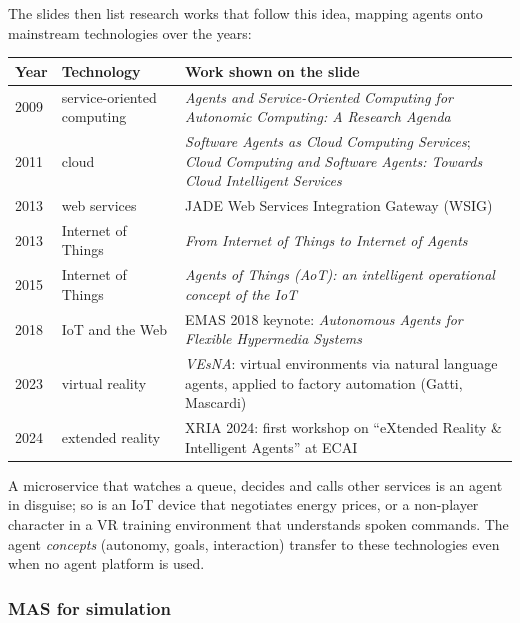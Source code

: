 The slides then list research works that follow this idea, mapping agents onto mainstream
technologies over the years:

\begin{center}
\small
\begin{tabularx}{\linewidth}{@{}l l X@{}}
\toprule
\textbf{Year} & \textbf{Technology} & \textbf{Work shown on the slide} \\
\midrule
2009 & service-oriented computing & \emph{Agents and Service-Oriented Computing for Autonomic Computing: A Research Agenda} \\
2011 & cloud & \emph{Software Agents as Cloud Computing Services}; \emph{Cloud Computing and Software Agents: Towards Cloud Intelligent Services} \\
2013 & web services & JADE Web Services Integration Gateway (WSIG) \\
2013 & Internet of Things & \emph{From Internet of Things to Internet of Agents} \\
2015 & Internet of Things & \emph{Agents of Things (AoT): an intelligent operational concept of the IoT} \\
2018 & IoT and the Web & EMAS 2018 keynote: \emph{Autonomous Agents for Flexible Hypermedia Systems} \\
2023 & virtual reality & \emph{VEsNA}: virtual environments via natural language agents, applied to factory automation (Gatti, Mascardi) \\
2024 & extended reality & XRIA 2024: first workshop on ``eXtended Reality \& Intelligent Agents'' at ECAI \\
\bottomrule
\end{tabularx}
\end{center}

\begin{nbwhy}
A microservice that watches a queue, decides and calls other services is an agent in
disguise; so is an IoT device that negotiates energy prices, or a non-player character in a
VR training environment that understands spoken commands. The agent \emph{concepts}
(autonomy, goals, interaction) transfer to these technologies even when no agent platform is
used.
\end{nbwhy}

\subsubsection{MAS for simulation}

